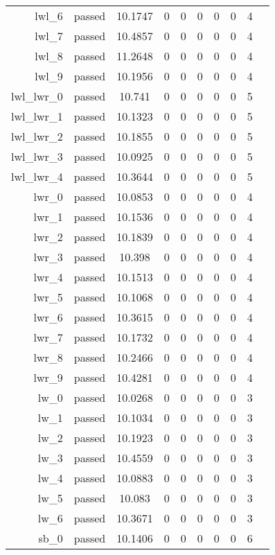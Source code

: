\begin{longtable}{r|ccccccccc}
    lwl\_6 & passed & 10.1747 & 0 & 0 & 0 & 0 & 0 & 4 \\
    lwl\_7 & passed & 10.4857 & 0 & 0 & 0 & 0 & 0 & 4 \\
    lwl\_8 & passed & 11.2648 & 0 & 0 & 0 & 0 & 0 & 4 \\
    lwl\_9 & passed & 10.1956 & 0 & 0 & 0 & 0 & 0 & 4 \\
    lwl\_lwr\_0 & passed & 10.741 & 0 & 0 & 0 & 0 & 0 & 5 \\
    lwl\_lwr\_1 & passed & 10.1323 & 0 & 0 & 0 & 0 & 0 & 5 \\
    lwl\_lwr\_2 & passed & 10.1855 & 0 & 0 & 0 & 0 & 0 & 5 \\
    lwl\_lwr\_3 & passed & 10.0925 & 0 & 0 & 0 & 0 & 0 & 5 \\
    lwl\_lwr\_4 & passed & 10.3644 & 0 & 0 & 0 & 0 & 0 & 5 \\
    lwr\_0 & passed & 10.0853 & 0 & 0 & 0 & 0 & 0 & 4 \\
    lwr\_1 & passed & 10.1536 & 0 & 0 & 0 & 0 & 0 & 4 \\
    lwr\_2 & passed & 10.1839 & 0 & 0 & 0 & 0 & 0 & 4 \\
    lwr\_3 & passed & 10.398 & 0 & 0 & 0 & 0 & 0 & 4 \\
    lwr\_4 & passed & 10.1513 & 0 & 0 & 0 & 0 & 0 & 4 \\
    lwr\_5 & passed & 10.1068 & 0 & 0 & 0 & 0 & 0 & 4 \\
    lwr\_6 & passed & 10.3615 & 0 & 0 & 0 & 0 & 0 & 4 \\
    lwr\_7 & passed & 10.1732 & 0 & 0 & 0 & 0 & 0 & 4 \\
    lwr\_8 & passed & 10.2466 & 0 & 0 & 0 & 0 & 0 & 4 \\
    lwr\_9 & passed & 10.4281 & 0 & 0 & 0 & 0 & 0 & 4 \\
    lw\_0 & passed & 10.0268 & 0 & 0 & 0 & 0 & 0 & 3 \\
    lw\_1 & passed & 10.1034 & 0 & 0 & 0 & 0 & 0 & 3 \\
    lw\_2 & passed & 10.1923 & 0 & 0 & 0 & 0 & 0 & 3 \\
    lw\_3 & passed & 10.4559 & 0 & 0 & 0 & 0 & 0 & 3 \\
    lw\_4 & passed & 10.0883 & 0 & 0 & 0 & 0 & 0 & 3 \\
    lw\_5 & passed & 10.083 & 0 & 0 & 0 & 0 & 0 & 3 \\
    lw\_6 & passed & 10.3671 & 0 & 0 & 0 & 0 & 0 & 3 \\
    sb\_0 & passed & 10.1406 & 0 & 0 & 0 & 0 & 0 & 6 \\

\end{longtable}
